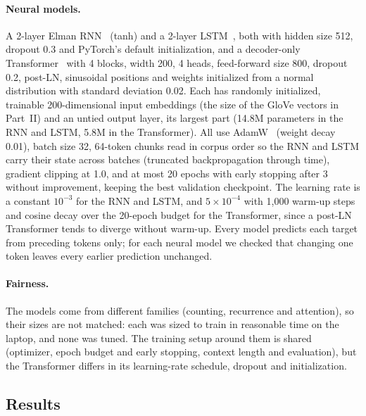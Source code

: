 \documentclass[10pt]{article}
\begin{document}
\paragraph{Neural models.} A 2-layer Elman RNN~\cite{mikolov2010} (tanh) and a 2-layer LSTM~\cite{hochreiter1997}, both with hidden size 512, dropout 0.3 and PyTorch's default initialization, and a decoder-only Transformer~\cite{vaswani2017} with 4 blocks, width 200, 4 heads, feed-forward size 800, dropout 0.2, post-LN, sinusoidal positions and weights initialized from a normal distribution with standard deviation 0.02. Each has randomly initialized, trainable 200-dimensional input embeddings (the size of the GloVe vectors in Part~II) and an untied output layer, its largest part (14.8M parameters in the RNN and LSTM, 5.8M in the Transformer). All use AdamW~\cite{loshchilov2019} (weight decay 0.01), batch size 32, 64-token chunks read in corpus order so the RNN and LSTM carry their state across batches (truncated backpropagation through time), gradient clipping at 1.0, and at most 20 epochs with early stopping after 3 without improvement, keeping the best validation checkpoint. The learning rate is a constant $10^{-3}$ for the RNN and LSTM, and $5\times10^{-4}$ with 1,000 warm-up steps and cosine decay over the 20-epoch budget for the Transformer, since a post-LN Transformer tends to diverge without warm-up. Every model predicts each target from preceding tokens only; for each neural model we checked that changing one token leaves every earlier prediction unchanged.

\paragraph{Fairness.} The models come from different families (counting, recurrence and attention), so their sizes are not matched: each was sized to train in reasonable time on the laptop, and none was tuned. The training setup around them is shared (optimizer, epoch budget and early stopping, context length and evaluation), but the Transformer differs in its learning-rate schedule, dropout and initialization.

\subsection{Results}
\end{document}
